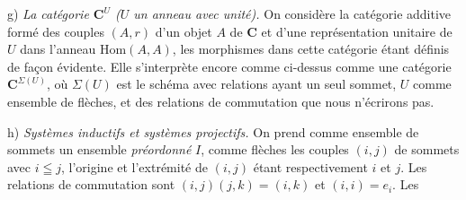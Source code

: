 g) \textit{La catégorie $\mathbf{C}^U$ ($U$ un anneau avec unité).} On
considère la catégorie additive formé des couples $(A,r)$ d'un objet $A$ de
$\mathbf{C}$ et d'une représentation unitaire de $U$ dans l'anneau
$\mathrm{Hom}(A,A)$, les morphismes dans cette catégorie étant définis de
façon évidente. Elle s'interprète encore comme ci-dessus comme une catégorie
$\mathbf{C}^{\Sigma(U)}$, où $\Sigma(U)$ est le schéma avec relations ayant un seul
sommet, $U$ comme ensemble de flèches, et des relations de commutation que nous
n'écrirons pas.

h) \textit{Systèmes inductifs et systèmes projectifs.} On prend
comme ensemble de sommets un ensemble \textit{préordonné} $I$, comme flèches
les couples $(i,j)$ de sommets avec $i\leqq j$, l'origine et l'extrémité de
$(i,j)$ étant respectivement $i$ et $j$. Les relations de commutation sont
$(i,j)(j,k)=(i,k)$ et $(i,i)=e_i$. Les

